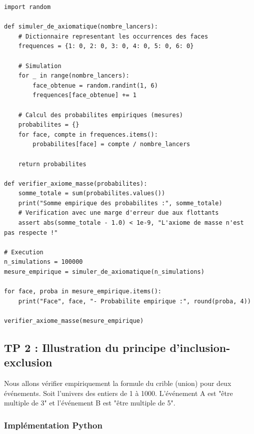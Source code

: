 \documentclass[11pt,a4paper]{article}
\begin{document}
\begin{lstlisting}
import random

def simuler_de_axiomatique(nombre_lancers):
    # Dictionnaire representant les occurrences des faces
    frequences = {1: 0, 2: 0, 3: 0, 4: 0, 5: 0, 6: 0}

    # Simulation
    for _ in range(nombre_lancers):
        face_obtenue = random.randint(1, 6)
        frequences[face_obtenue] += 1

    # Calcul des probabilites empiriques (mesures)
    probabilites = {}
    for face, compte in frequences.items():
        probabilites[face] = compte / nombre_lancers

    return probabilites

def verifier_axiome_masse(probabilites):
    somme_totale = sum(probabilites.values())
    print("Somme empirique des probabilites :", somme_totale)
    # Verification avec une marge d'erreur due aux flottants
    assert abs(somme_totale - 1.0) < 1e-9, "L'axiome de masse n'est pas respecte !"

# Execution
n_simulations = 100000
mesure_empirique = simuler_de_axiomatique(n_simulations)

for face, proba in mesure_empirique.items():
    print("Face", face, "- Probabilite empirique :", round(proba, 4))

verifier_axiome_masse(mesure_empirique)
\end{lstlisting}



\subsection*{TP 2 : Illustration du principe d'inclusion-exclusion}

Nous allons vérifier empiriquement la formule du crible (union) pour deux événements. Soit l'univers des entiers de 1 à 1000. L'événement A est "être multiple de 3" et l'événement B est "être multiple de 5".

\subsubsection*{Implémentation Python}
\end{document}
